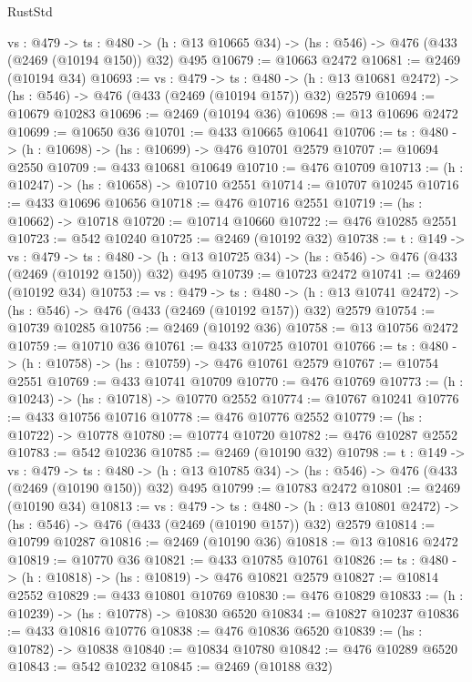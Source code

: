 \begin{lexlean}{RustStd}
\begin{coremodule}
  {vs : @479} ->
  {ts : @480} -> (h : @13 @10665 @34) -> (hs : @546) -> @476 (@433 (@2469 (@10194 @150)) @32) @495
@10679 := @10663 @2472
@10681 := @2469 (@10194 @34)
@10693 := {vs : @479} ->
  {ts : @480} ->
  (h : @13 @10681 @2472) -> (hs : @546) -> @476 (@433 (@2469 (@10194 @157)) @32) @2579
@10694 := @10679 @10283
@10696 := @2469 (@10194 @36)
@10698 := @13 @10696 @2472
@10699 := @10650 @36
@10701 := @433 @10665 @10641
@10706 := {ts : @480} -> (h : @10698) -> (hs : @10699) -> @476 @10701 @2579
@10707 := @10694 @2550
@10709 := @433 @10681 @10649
@10710 := @476 @10709
@10713 := (h : @10247) -> (hs : @10658) -> @10710 @2551
@10714 := @10707 @10245
@10716 := @433 @10696 @10656
@10718 := @476 @10716 @2551
@10719 := (hs : @10662) -> @10718
@10720 := @10714 @10660
@10722 := @476 @10285 @2551
@10723 := @542 @10240
@10725 := @2469 (@10192 @32)
@10738 := {t : @149} ->
  {vs : @479} ->
  {ts : @480} -> (h : @13 @10725 @34) -> (hs : @546) -> @476 (@433 (@2469 (@10192 @150)) @32) @495
@10739 := @10723 @2472
@10741 := @2469 (@10192 @34)
@10753 := {vs : @479} ->
  {ts : @480} ->
  (h : @13 @10741 @2472) -> (hs : @546) -> @476 (@433 (@2469 (@10192 @157)) @32) @2579
@10754 := @10739 @10285
@10756 := @2469 (@10192 @36)
@10758 := @13 @10756 @2472
@10759 := @10710 @36
@10761 := @433 @10725 @10701
@10766 := {ts : @480} -> (h : @10758) -> (hs : @10759) -> @476 @10761 @2579
@10767 := @10754 @2551
@10769 := @433 @10741 @10709
@10770 := @476 @10769
@10773 := (h : @10243) -> (hs : @10718) -> @10770 @2552
@10774 := @10767 @10241
@10776 := @433 @10756 @10716
@10778 := @476 @10776 @2552
@10779 := (hs : @10722) -> @10778
@10780 := @10774 @10720
@10782 := @476 @10287 @2552
@10783 := @542 @10236
@10785 := @2469 (@10190 @32)
@10798 := {t : @149} ->
  {vs : @479} ->
  {ts : @480} -> (h : @13 @10785 @34) -> (hs : @546) -> @476 (@433 (@2469 (@10190 @150)) @32) @495
@10799 := @10783 @2472
@10801 := @2469 (@10190 @34)
@10813 := {vs : @479} ->
  {ts : @480} ->
  (h : @13 @10801 @2472) -> (hs : @546) -> @476 (@433 (@2469 (@10190 @157)) @32) @2579
@10814 := @10799 @10287
@10816 := @2469 (@10190 @36)
@10818 := @13 @10816 @2472
@10819 := @10770 @36
@10821 := @433 @10785 @10761
@10826 := {ts : @480} -> (h : @10818) -> (hs : @10819) -> @476 @10821 @2579
@10827 := @10814 @2552
@10829 := @433 @10801 @10769
@10830 := @476 @10829
@10833 := (h : @10239) -> (hs : @10778) -> @10830 @6520
@10834 := @10827 @10237
@10836 := @433 @10816 @10776
@10838 := @476 @10836 @6520
@10839 := (hs : @10782) -> @10838
@10840 := @10834 @10780
@10842 := @476 @10289 @6520
@10843 := @542 @10232
@10845 := @2469 (@10188 @32)

\end{coremodule}
\end{lexlean}
